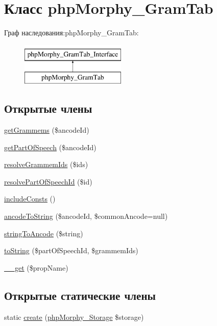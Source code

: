 \hypertarget{classphpMorphy__GramTab}{
\section{Класс phpMorphy\_\-GramTab}
\label{classphpMorphy__GramTab}
}
Граф наследования:phpMorphy\_\-GramTab:\begin{figure}[H]
\begin{center}
\leavevmode
\includegraphics[height=2.000000cm]{classphpMorphy__GramTab}
\end{center}
\end{figure}
\subsection*{Открытые члены}
\begin{DoxyCompactItemize}
\item 
\hyperlink{classphpMorphy__GramTab_acd339c0158bf69afdfd00ba2273a3722}{getGrammems} (\$ancodeId)
\item 
\hyperlink{classphpMorphy__GramTab_a8aa97495600e8fbd6dc534365b9145e5}{getPartOfSpeech} (\$ancodeId)
\item 
\hyperlink{classphpMorphy__GramTab_afa99b6301598d6b60a22e63647ff24d4}{resolveGrammemIds} (\$ids)
\item 
\hyperlink{classphpMorphy__GramTab_aa71f3a190c26fe9a938d90e0000ae6d0}{resolvePartOfSpeechId} (\$id)
\item 
\hyperlink{classphpMorphy__GramTab_a5a78efa117530fa256f1f49f6afe56b4}{includeConsts} ()
\item 
\hyperlink{classphpMorphy__GramTab_af7a41bb82bab87ea12b2abed4dfde274}{ancodeToString} (\$ancodeId, \$commonAncode=null)
\item 
\hyperlink{classphpMorphy__GramTab_a1f411dd80d6c23355b31fc01c8159bef}{stringToAncode} (\$string)
\item 
\hyperlink{classphpMorphy__GramTab_ac8bfd7100deebdcce34318a164f46cb6}{toString} (\$partOfSpeechId, \$grammemIds)
\item 
\hyperlink{classphpMorphy__GramTab_ace1570d2435c1e482a976e28c73d93fd}{\_\-\_\-get} (\$propName)
\end{DoxyCompactItemize}
\subsection*{Открытые статические члены}
\begin{DoxyCompactItemize}
\item 
static \hyperlink{classphpMorphy__GramTab_a8ab58c6d46b68c699ed14492d2c3a83e}{create} (\hyperlink{classphpMorphy__Storage}{phpMorphy\_\-Storage} \$storage)
\end{DoxyCompactItemize}
